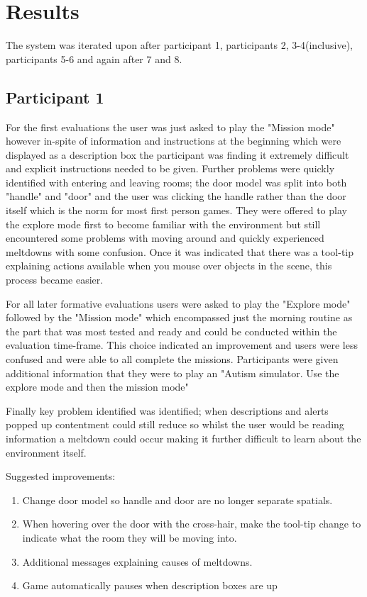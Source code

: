 \section{Results}
The system was iterated upon after participant 1, participants 2, 3-4(inclusive), participants 5-6 and again after 7 and 8.

\subsection*{Participant 1}

For the first evaluations the user was just asked to play the "Mission mode" however in-spite of information and instructions at the beginning which were displayed as a description box the participant was finding it extremely difficult and explicit instructions needed to be given. Further problems were quickly identified with entering and leaving rooms; the door model was split into both "handle" and "door" and the user was clicking the handle rather than the door itself which is the norm for most first person games. They were offered to play the explore mode first to become familiar with the environment but still encountered some problems with moving around and quickly experienced meltdowns with some confusion. Once it was indicated that there was a tool-tip explaining actions available when you mouse over objects in the scene, this process became easier. 

For all later formative evaluations users were asked to play the "Explore mode" followed by the "Mission mode" which encompassed just the morning routine as the part that was most tested and ready and could be conducted within the evaluation time-frame. This choice indicated an improvement and users were less confused and were able to all complete the missions. Participants were given additional information that they were to play an "Autism simulator. Use the explore mode and then the mission mode"

Finally key problem identified  was identified; when descriptions and alerts popped up contentment could still reduce so whilst the user would be reading information a meltdown could occur making it further difficult to learn about the environment itself.

Suggested improvements:
\begin{enumerate}
\item Change door model so handle and door are no longer separate spatials. 
\item When hovering over the door with the cross-hair, make the tool-tip change to indicate what the room they will be moving into. 
\item Additional messages explaining causes of meltdowns.
\item Game automatically pauses when description boxes are up
\end{enumerate}

